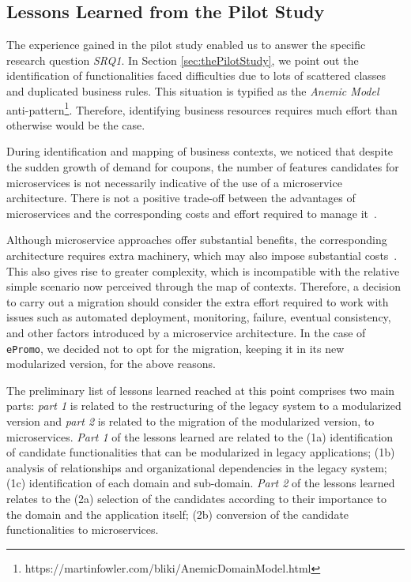 \documentclass[a4paper,twoside]{article}
\begin{document}
\subsection{Lessons Learned from the Pilot Study}

The experience gained in the pilot study enabled us to answer the specific research question \textit{SRQ1}. In Section \ref{sec:thePilotStudy}, we point out the identification of functionalities faced difficulties due to lots of scattered classes and duplicated business rules. This situation is typified as the \textit{Anemic Model} anti-pattern\footnote{https://martinfowler.com/bliki/AnemicDomainModel.html}. Therefore, identifying business resources requires much effort than otherwise would be the case.

During identification and mapping of business contexts, we noticed that despite the sudden growth of demand for coupons, the number of features candidates for microservices is not necessarily indicative of the use of a microservice architecture. There is not a positive trade-off between the advantages of microservices and the corresponding costs and effort required to manage it~\cite{singleton2016economics}.

Although microservice approaches offer substantial benefits, the corresponding architecture requires extra machinery, which may also impose substantial costs~\cite{singleton2016economics}. This also gives rise to greater complexity, which is incompatible with the relative simple scenario now perceived through the map of contexts. Therefore, a decision to carry out a migration should consider the extra effort required to work with issues such as automated deployment, monitoring, failure, eventual consistency, and other factors introduced by a microservice architecture. In the case of \texttt{ePromo}, we decided not to opt for the migration, keeping it in its new modularized version, for the above reasons.

The preliminary list of lessons learned reached at this point comprises two main parts: \textit{part 1} is related to the restructuring of the legacy system to a modularized version and \textit{part 2} is related to the migration of the modularized version, to microservices. \textit{Part 1} of the lessons learned are related to the (1a) identification of candidate functionalities that can be modularized in legacy applications; (1b) analysis of relationships and organizational dependencies in the legacy system; (1c) identification of each domain and sub-domain. \textit{Part 2} of the lessons learned relates to the (2a) selection of the candidates according to their importance to the domain and the application itself; (2b) conversion of the candidate functionalities to microservices.
\end{document}

